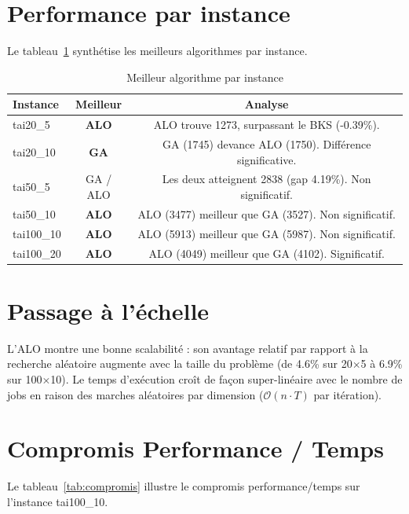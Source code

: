 \documentclass[12pt,a4paper,twoside]{report}
\begin{document}
\section{Performance par instance}

Le tableau~\ref{tab:best_per_instance} synthétise les meilleurs algorithmes par instance.

\begin{table}[H]
\centering
{}
\caption{Meilleur algorithme par instance}
\label{tab:best_per_instance}
\begin{tabular}{lcc}
\toprule
\rowcolor{TableHeader}
\color{white}Instance & \color{white}Meilleur & \color{white}Analyse \\
\midrule
tai20\_5   & \textbf{ALO} & ALO trouve 1273, surpassant le BKS (-0.39\%). \\
tai20\_10  & \textbf{GA}  & GA (1745) devance ALO (1750). Différence significative. \\
tai50\_5   & GA / ALO     & Les deux atteignent 2838 (gap 4.19\%). Non significatif. \\
tai50\_10  & \textbf{ALO} & ALO (3477) meilleur que GA (3527). Non significatif. \\
tai100\_10 & \textbf{ALO} & ALO (5913) meilleur que GA (5987). Non significatif. \\
tai100\_20 & \textbf{ALO} & ALO (4049) meilleur que GA (4102). Significatif. \\
\bottomrule
\end{tabular}
\end{table}

\section{Passage à l'échelle}

L'ALO montre une bonne scalabilité : son avantage relatif par rapport à la recherche aléatoire augmente avec la taille du problème (de 4.6\% sur 20$\times$5 à 6.9\% sur 100$\times$10). Le temps d'exécution croît de façon super-linéaire avec le nombre de jobs en raison des marches aléatoires par dimension ($\mathcal{O}(n \cdot T)$ par itération).

\section{Compromis Performance / Temps}

Le tableau~\ref{tab:compromis} illustre le compromis performance/temps sur l'instance tai100\_10.
\end{document}
